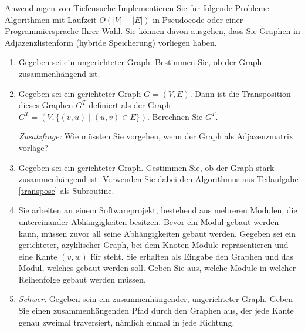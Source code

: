 \documentclass[11pt,a4paper]{article}
\begin{document}
\begin{aufgabe}{4}{Anwendungen von Tiefensuche}
    Implementieren Sie für folgende Probleme Algorithmen mit Laufzeit $O(|V| + |E|)$ in Pseudocode oder einer Programmiersprache Ihrer Wahl.
    Sie können davon ausgehen, dass Sie Graphen in Adjazenzlistenform (hybride Speicherung) vorliegen haben.
    \begin{enumerate}[label=\alph*)]
        \item \label{connected}
        Gegeben sei ein ungerichteter Graph.
        Bestimmen Sie, ob der Graph zusammenhängend ist.
        \item \label{transpose} Gegeben sei ein gerichteter Graph $G = (V, E)$. Dann ist die Transposition dieses Graphen $G^T$ definiert als der Graph $G^T = (V, \{(v, u) \mid (u, v) \in E\})$.
        Berechnen Sie $G^T$.
        
        \emph{Zusatzfrage:} Wie müssten Sie vorgehen, wenn der Graph als Adjazenzmatrix vorläge?
        \item 
        Gegeben sei ein gerichteter Graph.
        Gestimmen Sie, ob der Graph stark zusammenhängend ist.
        Verwenden Sie dabei den Algorithmus aus Teilaufgabe \ref*{transpose} als Subroutine.
        \item
        Sie arbeiten an einem Softwareprojekt, bestehend aus mehreren Modulen, die untereinander Abhängigkeiten besitzen.
        Bevor ein Modul gebaut werden kann, müssen zuvor all seine Abhängigkeiten gebaut werden.
        Gegeben sei ein gerichteter, azyklischer Graph, bei dem Knoten Module repräsentieren und eine Kante $(v, w)$ für  steht.
        Sie erhalten als Eingabe den Graphen und das Modul, welches gebaut werden soll.
        Geben Sie aus, welche Module in welcher Reihenfolge gebaut werden müssen.
        \item
        \emph{Schwer:} Gegeben sein ein zusammenhängender, ungerichteter Graph.
        Geben Sie einen zusammenhängenden Pfad durch den Graphen aus, der jede Kante genau zweimal traversiert, nämlich einmal in jede Richtung.
    \end{enumerate}
\end{aufgabe}
\end{document}
